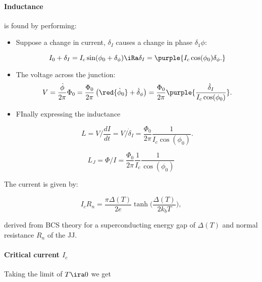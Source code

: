 \paragraph{Inductance} is found by performing:

\begin{itemize}
\item Suppose a change in current, $ \delta_I $ causes a change in phase $ \delta_1\phi $:

    \begin{equation}\label{key}
      I_0 + \delta_I = I_c\sin(\phi_0+\delta_\phi) \iRa \delta_I = \purple{I_c\cos(\phi_0)\delta_\phi.}
    \end{equation}
  \item The voltage across the junction:
    \begin{equation}\label{key}
      V = \frac{\dot{\phi}}{2\pi}\Phi_0 = \frac{\Phi_0}{2\pi}\left(\red{\dot{\phi}_0} + \dot{\delta}_\phi\right) =  \frac{\Phi_0}{2\pi}\purple{\frac{\dot{\delta}_I}{I_c\cos(\phi_0)}}.
    \end{equation}

  \item FInally expressing the inductance

    \begin{equation}\label{key}
      L = V/\frac{dI}{dt} = V/\dot{\delta}_I = \frac{\Phi_0}{2\pi}\frac{1}{I_c\cos(\phi_0)}.
    \end{equation}
  \end{itemize}

  \begin{framed}\noindent
    \begin{equation}\label{key} L_J = \Phi/I =
      \frac{\Phi_0}{2\pi}\frac{1}{I_c}\frac{1}{\cos(\phi_0)}
    \end{equation}
  \end{framed}

  \noindent The current is given by:

   \begin{equation}\label{introducing-qed-operators-critical-current}
     I_cR_n = \frac{\pi\Delta(T)}{2e}\tanh\big(\frac{\Delta(T)}{2k_bT}\big),
   \end{equation}

   \noindent derived from BCS theory for a superconducting energy gap  of $ \Delta(T) $ and normal resistance $ R_n $ of
   the JJ.

   \paragraph{Critical current $ I_c $}
   Taking the limit of $ T\ira0 $ we get

